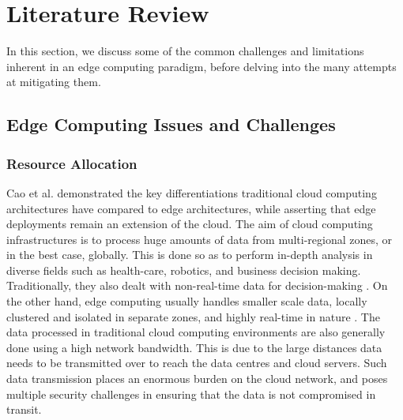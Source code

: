 \section{Literature Review}
\label{sec:lit-review}

In this section, we discuss some of the common challenges and limitations inherent in an edge computing paradigm, before delving into the many attempts at mitigating them.

\subsection{Edge Computing Issues and Challenges}
\label{subsec:edge-issues}

\subsubsection{Resource Allocation}
\label{subsubsec:edge-resource-alloc}

Cao et al. \cite{cao2020overview} demonstrated the key differentiations traditional cloud computing architectures have compared to edge architectures, while asserting that edge deployments remain an extension of the cloud. The aim of cloud computing infrastructures is to process huge amounts of data from multi-regional zones, or in the best case, globally. This is done so as to perform in-depth analysis in diverse fields such as health-care, robotics, and business decision making. Traditionally, they also dealt with non-real-time data for decision-making \cite{premsankar2018edge}. On the other hand, edge computing usually handles smaller scale data, locally clustered and isolated in separate zones, and highly real-time in nature \cite{mishra2020early}. The data processed in traditional cloud computing environments are also generally done using a high network bandwidth. This is due to the large distances data needs to be transmitted over to reach the data centres and cloud servers. Such data transmission places an enormous burden on the cloud network, and poses multiple security challenges in ensuring that the data is not compromised in transit.\par

